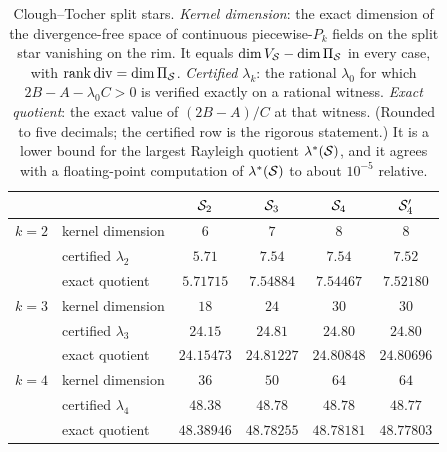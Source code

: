 \begin{table}[ht]
\centering
\begin{tabular}{llcccc}
\toprule
 & & $\mathcal S_2$ & $\mathcal S_3$ & $\mathcal S_4$ & $\mathcal S_4'$\\
\midrule
$k=2$ & kernel dimension & $6$ & $7$ & $8$ & $8$\\
 & certified $\lambda_2$ & $5.71$ & $7.54$ & $7.54$ & $7.52$\\
 & exact quotient & $5.71715$ & $7.54884$ & $7.54467$ & $7.52180$\\
\midrule
$k=3$ & kernel dimension & $18$ & $24$ & $30$ & $30$\\
 & certified $\lambda_3$ & $24.15$ & $24.81$ & $24.80$ & $24.80$\\
 & exact quotient & $24.15473$ & $24.81227$ & $24.80848$ & $24.80696$\\
\midrule
$k=4$ & kernel dimension & $36$ & $50$ & $64$ & $64$\\
 & certified $\lambda_4$ & $48.38$ & $48.78$ & $48.78$ & $48.77$\\
 & exact quotient & $48.38946$ & $48.78255$ & $48.78181$ & $48.77803$\\
\bottomrule
\end{tabular}
\caption{Clough--Tocher split stars. \emph{Kernel dimension}: the exact dimension of the divergence-free space of continuous piecewise-$P_k$ fields on the split star vanishing on the rim. It equals $\dim V_\mathcal S-\dim\Pi_\mathcal S$ in every case, with $\operatorname{rank}\operatorname{div}=\dim\Pi_\mathcal S$. \emph{Certified $\lambda_k$}: the rational $\lambda_0$ for which $2B-A-\lambda_0C>0$ is verified exactly on a rational witness. \emph{Exact quotient}: the exact value of $(2B-A)/C$ at that witness. (Rounded to five decimals; the certified row is the rigorous statement.) It is a lower bound for the largest Rayleigh quotient $\lambda^\ast(\mathcal S)$, and it agrees with a floating-point computation of $\lambda^\ast(\mathcal S)$ to about $10^{-5}$ relative.}
\label{ct:tab:lam}
\end{table}

